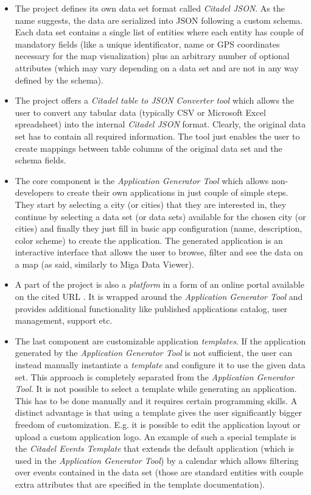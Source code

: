 \begin{itemize}
\item The project defines its own data set format called \emph{Citadel JSON}. As the name suggests, the data are serialized into JSON following a custom schema. Each data set contains a single list of entities where each entity has couple of mandatory fields (like a unique identificator, name or GPS coordinates necessary for the map visualization) plus an arbitrary number of optional attributes (which may vary depending on a data set and are not in any way defined by the schema). 
\item The project offers a \emph{Citadel table to JSON Converter tool} which allows the user to convert any tabular data (typically CSV or Microsoft Excel spreadsheet) into the internal \emph{Citadel JSON} format. Clearly, the original data set has to contain all required information. The tool just enables the user to create mappings between table columns of the original data set and the schema fields.
\item The core component is the \emph{Application Generator Tool} which allows non-developers to create their own applications in just couple of simple steps. They start by selecting a city (or cities) that they are interested in, they continue by selecting a data set (or data sets) available for the chosen city (or cities) and finally they just fill in basic app configuration (name, description, color scheme) to create the application. The generated application is an interactive interface that allows the user to browse, filter and see the data on a map (as said, similarly to Miga Data Viewer).
\item A part of the project is also a \emph{platform} in a form of an online portal available on the cited URL \cite{citadel_home}. It is wrapped around the  \emph{Application Generator Tool} and provides additional functionality like published applications catalog, user management, support etc.
\item The last component are customizable application \emph{templates}. If the application generated by the \emph{Application Generator Tool} is not sufficient, the user can instead manually instantiate a \emph{template} and configure it to use the given data set. This approach is completely separated from the \emph{Application Generator Tool}. It is not possible to select a template while generating an application. This has to be done manually and it requires certain programming skills. A distinct advantage is that using a template gives the user significantly bigger freedom of customization. E.g. it is possible to edit the application layout or upload a custom application logo. An example of such a special template is the \emph{Citadel Events Template} that extends the default application (which is used in the \emph{Application Generator Tool}) by a calendar which allows filtering over events contained in the data set (those are standard entities with couple extra attributes that are specified in the template documentation).
\end{itemize}

